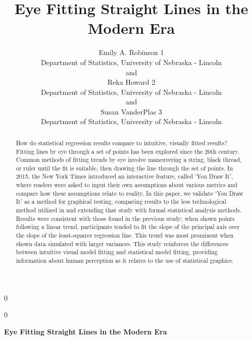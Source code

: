 \documentclass[12pt]{article}
\newcommand{\blind}{0}
\begin{document}
\def\spacingset#1{\renewcommand{\baselinestretch}%
{#1}\small\normalsize} \spacingset{1}



\blind
{
  \title{\bf Eye Fitting Straight Lines in the Modern Era}

  \author{
        Emily A. Robinson 1 \\
    Department of Statistics, University of Nebraska - Lincoln\\
     and \\     Reka Howard 2 \\
    Department of Statistics, University of Nebraska - Lincoln\\
     and \\     Susan VanderPlas 3 \\
    Department of Statistics, University of Nebraska - Lincoln\\
      }
  \maketitle
} \fi

\blind
{
  \bigskip
  \bigskip
  \bigskip
  \begin{center}
    {\LARGE\bf Eye Fitting Straight Lines in the Modern Era}
  \end{center}
  \medskip
} \fi

\bigskip
\begin{abstract}
How do statistical regression results compare to intuitive, visually
fitted results? Fitting lines by eye through a set of points has been
explored since the 20th century. Common methods of fitting trends by eye
involve maneuvering a string, black thread, or ruler until the fit is
suitable, then drawing the line through the set of points. In 2015, the
New York Times introduced an interactive feature, called `You Draw It',
where readers were asked to input their own assumptions about various
metrics and compare how these assumptions relate to reality. In this
paper, we validate `You Draw It' as a method for graphical testing,
comparing results to the less technological method utilized in
\citet{mosteller1981eye} and extending that study with formal
statistical analysis methods. Results were consistent with those found
in the previous study; when shown points following a linear trend,
participants tended to fit the slope of the principal axis over the
slope of the least-squares regression line. This trend was most
prominent when shown data simulated with larger variances. This study
reinforces the differences between intuitive visual model fitting and
statistical model fitting, providing information about human perception
as it relates to the use of statistical graphics.
\end{abstract}
\end{document}
